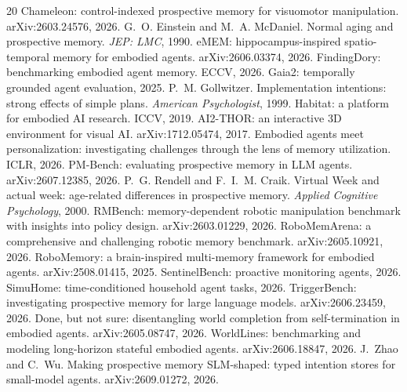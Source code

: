 \documentclass{article} %
\begin{document}
\begin{thebibliography}{20}\small
{} Chameleon: control-indexed prospective
memory for visuomotor manipulation. arXiv:2603.24576, 2026.
 G.~O. Einstein and M.~A.
McDaniel. Normal aging and prospective memory. \emph{JEP: LMC}, 1990.
 eMEM: hippocampus-inspired spatio-temporal memory
for embodied agents. arXiv:2606.03374, 2026.
 FindingDory: benchmarking embodied
agent memory. ECCV, 2026.
 Gaia2: temporally grounded agent evaluation, 2025.
 P.~M. Gollwitzer. Implementation
intentions: strong effects of simple plans. \emph{American Psychologist}, 1999.
 Habitat: a platform for embodied AI research.
ICCV, 2019.
 AI2-THOR: an interactive 3D environment for
visual AI. arXiv:1712.05474, 2017.
 Embodied agents meet personalization:
investigating challenges through the lens of memory utilization. ICLR, 2026.
 PM-Bench: evaluating prospective memory in
LLM agents. arXiv:2607.12385, 2026.
 P.~G. Rendell and F.~I.~M. Craik.
Virtual Week and actual week: age-related differences in prospective memory.
\emph{Applied Cognitive Psychology}, 2000.
 RMBench: memory-dependent robotic
manipulation benchmark with insights into policy design. arXiv:2603.01229,
2026.
 RoboMemArena: a comprehensive and
challenging robotic memory benchmark. arXiv:2605.10921, 2026.
 RoboMemory: a brain-inspired multi-memory
framework for embodied agents. arXiv:2508.01415, 2025.
 SentinelBench: proactive monitoring
agents, 2026.
 SimuHome: time-conditioned household agent
tasks, 2026.
 TriggerBench: investigating
prospective memory for large language models. arXiv:2606.23459, 2026.
 Done, but not sure: disentangling world completion
from self-termination in embodied agents. arXiv:2605.08747, 2026.
 WorldLines: benchmarking and modeling
long-horizon stateful embodied agents. arXiv:2606.18847, 2026.
 J.~Zhao and C.~Wu. Making prospective
memory SLM-shaped: typed intention stores for small-model agents.
arXiv:2609.01272, 2026.
\end{thebibliography}
\end{document}
